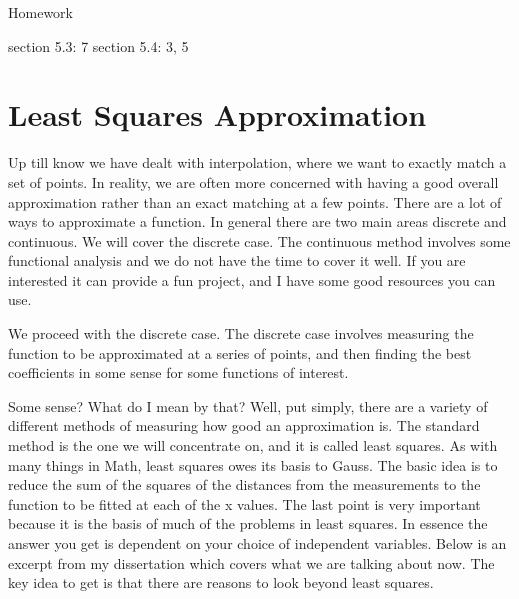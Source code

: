 Homework

section 5.3: 7
section 5.4: 3, 5

\newpage

\section{Least Squares Approximation}

Up till know we have dealt with interpolation, where we want to 
exactly match a set of points.  In reality, we are often more 
concerned with having a good overall approximation rather than an 
exact matching at a few points.  There are a lot of ways to 
approximate a function.  In general there are two main areas discrete 
and continuous.  We will cover the discrete case.  The continuous method 
involves some functional analysis and we do not have the time to 
cover it well.  If you are interested it can provide a fun project, 
and I have some good resources you can use.

We proceed with the discrete case.  The discrete case involves 
measuring the function to be approximated at a series of points, and 
then finding the best coefficients in some sense for some functions 
of interest.  

Some sense?  What do I mean by that?  Well, put simply, there are a 
variety of different methods of measuring how good an approximation 
is.  The standard method is the one we will concentrate on, and it is 
called least squares.  As with many things in Math, least squares 
owes its basis to Gauss.  The basic idea is to reduce the sum of the 
squares of the distances from the measurements to the function to be 
fitted at each of the x values.  The last point is very important 
because it is the basis of much of the problems in least squares.  In 
essence the answer you get is dependent on your choice of independent 
variables.  Below is an excerpt from my dissertation which covers what 
we are talking about now.  The key idea to get is that there are 
reasons to look beyond least squares.

